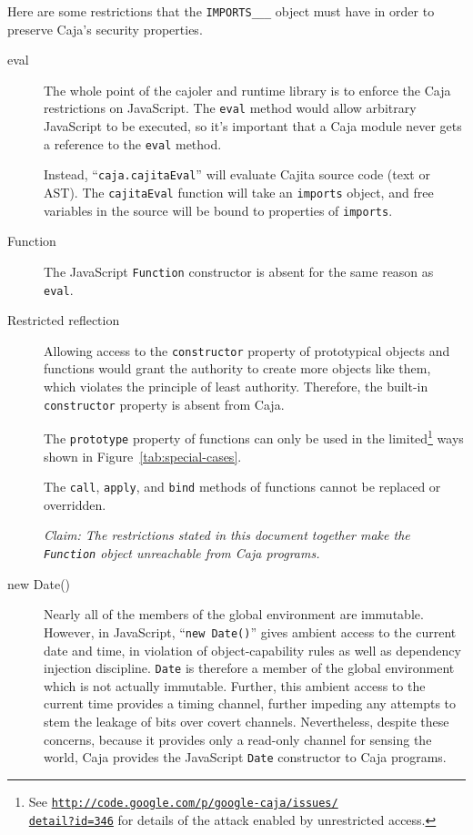 \documentclass[letterpaper,twocolumn,10pt]{article}
\newcommand{\myurl}[1]{{\href{http://#1}{\texttt{#1}}}}
\newcommand{\code}[1]{{\tt {#1}}}              %
\begin{document}
Here are some restrictions that the \code{IMPORTS\_\_\_} object must have in order
to preserve Caja's security properties.
\begin{description}

    \item[eval]  The whole point of the cajoler and runtime library is to enforce
    the Caja restrictions on JavaScript.  The \code{eval} method would allow
    arbitrary JavaScript to be executed, so it's important that a Caja module never
    gets a reference to the \code{eval} method.
    
    Instead, ``\code{caja.cajitaEval}'' will evaluate Cajita source code (text or 
    AST).  The \code{cajitaEval} function will take an \code{imports} object, and
    free variables in the source will be bound to properties of \code{imports}.
    
    \item[Function] The JavaScript \code{Function} constructor is absent 
    for the same reason as \code{eval}.
    
    \item[Restricted reflection] Allowing access to the \code{constructor} property of 
    prototypical objects and functions would grant the authority to create more objects like them,
    which violates the principle of least authority.  Therefore, the built-in \code{constructor} 
    property is absent from Caja. 
    
    The \code{prototype} property of functions can only be
    used in the limited\footnote{
    See \myurl{http://code.google.com/p/google-caja/issues/} \\
    \myurl{detail?id=346} for details of the attack enabled by unrestricted access.
    } ways shown in Figure~\ref{tab:special-cases}. 
    
    The \code{call}, \code{apply}, and
    \code{bind} methods of functions cannot be replaced or overridden.
    
    \emph{Claim: The restrictions stated in this document together make the 
    \code{Function} object unreachable from Caja programs.}

    \item[new Date()] Nearly all of the members of the global environment
    are immutable.  However, in JavaScript, ``\code{new Date()}''  gives ambient 
    access to the current date and time, in violation of object-capability 
    rules as well as dependency injection discipline. \code{Date} is 
    therefore a member of the global environment which is not actually 
    immutable. Further, this ambient access to the current time provides a 
    timing channel, further impeding any attempts to stem the leakage of bits 
    over covert channels. Nevertheless, despite these concerns, because it 
    provides only a read-only channel for sensing the world, Caja provides 
    the JavaScript \code{Date} constructor to Caja programs.


\end{description}
\end{document}
